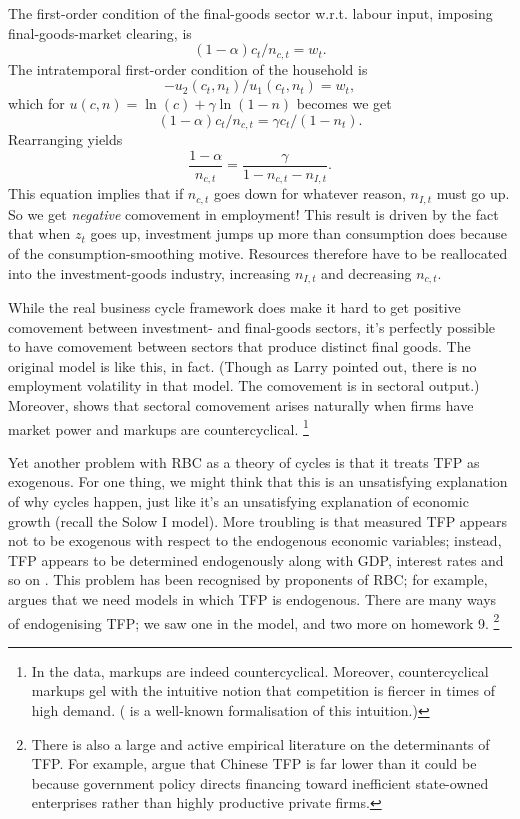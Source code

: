 \documentclass[11pt,letterpaper,reqno,oneside]{article}
\begin{document}
The first-order condition of the final-goods sector w.r.t. labour input, imposing final-goods-market clearing, is
%
\begin{equation*}
	(1-\alpha) c_t / n_{c,t} = w_t .
\end{equation*}
%
The intratemporal first-order condition of the household is
%
\begin{equation*}
	- u_2(c_t,n_t) / u_1(c_t,n_t) = w_t ,
\end{equation*}
%
which for $u(c,n) = \ln(c) + \gamma \ln(1-n)$ becomes
%
we get
%
\begin{equation*}
	(1-\alpha) c_t / n_{c,t} 
	= \gamma c_t / (1-n_t) .
\end{equation*}
%
Rearranging yields
%
\begin{equation*}
	\frac{1-\alpha}{n_{c,t}} = \frac{\gamma}{1-n_{c,t}-n_{I,t}} .
\end{equation*}
%
This equation implies that if $n_{c,t}$ goes down for whatever reason, $n_{I,t}$ must go up. So we get \emph{negative} comovement in employment! This result is driven by the fact that when $z_t$ goes up, investment jumps up more than consumption does because of the consumption-smoothing motive. Resources therefore have to be reallocated into the investment-goods industry, increasing $n_{I,t}$ and decreasing $n_{c,t}$.

While the real business cycle framework does make it hard to get positive comovement between investment- and final-goods sectors, it's perfectly possible to have comovement between sectors that produce distinct final goods. The original \textcite{LongPlosser1983} model is like this, in fact. (Though as Larry pointed out, there is no employment volatility in that model. The comovement is in sectoral output.) Moreover, \textcite{Dicecio2009} shows that sectoral comovement arises naturally when firms have market power and markups are countercyclical.%
	\footnote{In the data, markups are indeed countercyclical. Moreover, countercyclical markups gel with the intuitive notion that competition is fiercer in times of high demand. (\textcite{RotembergSaloner1986} is a well-known formalisation of this intuition.)}


Yet another problem with RBC as a theory of cycles is that it treats TFP as exogenous. For one thing, we might think that this is an unsatisfying explanation of why cycles happen, just like it's an unsatisfying explanation of economic growth (recall the Solow I model). More troubling is that measured TFP appears not to be exogenous with respect to the endogenous economic variables; instead, TFP appears to be determined endogenously along with GDP, interest rates and so on \parencite{Evans1992}. This problem has been recognised by proponents of RBC; for example, \textcite{Prescott1998} argues that we need models in which TFP is endogenous. There are many ways of endogenising TFP; we saw one in the \textcite{CominGertler2006} model, and two more on homework 9.%
	\footnote{There is also a large and active empirical literature on the determinants of TFP. For example, \textcite{SongStoreslettenZilibotti2011} argue that Chinese TFP is far lower than it could be because government policy directs financing toward inefficient state-owned enterprises rather than highly productive private firms.}
\end{document}
